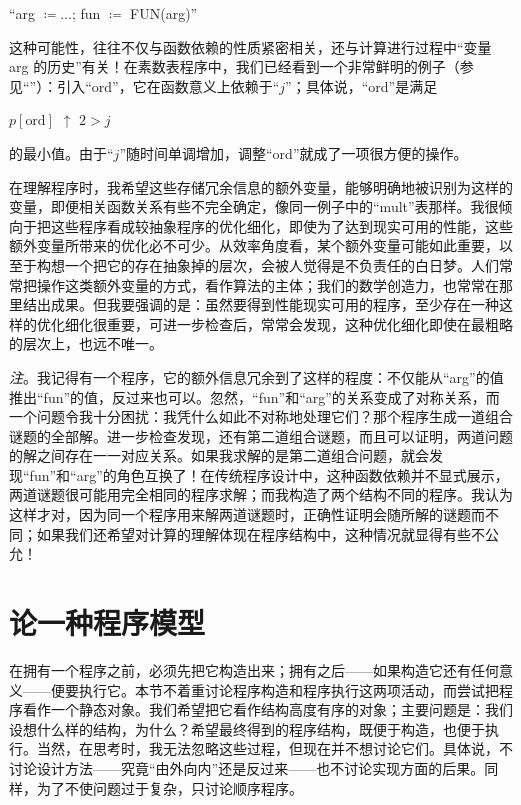 {
	\setlength{\parindent}{8em}
	\hspace{-.4em}``arg $\coloneq\dots$; fun $\coloneq$ FUN(arg)''
}
\medskip

这种可能性，往往不仅与函数依赖的性质紧密相关，还与计算进行过程中“变量 arg 的历史”有关！在素数表程序中，我们已经看到一个非常鲜明的例子（参见“”）：引入“ord”，它在函数意义上依赖于“$j$”；具体说，“ord”是满足
\medskip

{
	\setlength{\parindent}{8em}
	$p[\text{ord}]$ $\uparrow$ $2 > j$
}
\medskip

\noindent
的最小值。由于“$j$”随时间单调增加，调整“ord”就成了一项很方便的操作。

在理解程序时，我希望这些存储冗余信息的额外变量，能够明确地被识别为这样的变量，即便相关函数关系有些不完全确定，像同一例子中的“mult”表那样。我很倾向于把这些程序看成较抽象程序的优化细化，即使为了达到现实可用的性能，这些额外变量所带来的优化必不可少。从效率角度看，某个额外变量可能如此重要，以至于构想一个把它的存在抽象掉的层次，会被人觉得是不负责任的白日梦。人们常常把操作这类额外变量的方式，看作算法的主体；我们的数学创造力，也常常在那里结出成果。但我要强调的是：虽然要得到性能现实可用的程序，至少存在一种这样的优化细化很重要，可进一步检查后，常常会发现，这种优化细化即使在最粗略的层次上，也远不唯一。

\noindent
\textit{注}。我记得有一个程序，它的额外信息冗余到了这样的程度：不仅能从“arg”的值推出“fun”的值，反过来也可以。忽然，“fun”和“arg”的关系变成了对称关系，而一个问题令我十分困扰：我凭什么如此不对称地处理它们？那个程序生成一道组合谜题的全部解。进一步检查发现，还有第二道组合谜题，而且可以证明，两道问题的解之间存在一一对应关系。如果我求解的是第二道组合问题，就会发现“fun”和“arg”的角色互换了！在传统程序设计中，这种函数依赖并不显式展示，两道谜题很可能用完全相同的程序求解；而我构造了两个结构不同的程序。我认为这样才对，因为同一个程序用来解两道谜题时，正确性证明会随所解的谜题而不同；如果我们还希望对计算的理解体现在程序结构中，这种情况就显得有些不公允！

\section[论一种程序模型]{论一种程序模型}
\label{eq:program-model}

在拥有一个程序之前，必须先把它构造出来；拥有之后——如果构造它还有任何意义——便要执行它。本节不着重讨论程序构造和程序执行这两项活动，而尝试把程序看作一个静态对象。我们希望把它看作结构高度有序的对象；主要问题是：我们设想什么样的结构，为什么？希望最终得到的程序结构，既便于构造，也便于执行。当然，在思考时，我无法忽略这些过程，但现在并不想讨论它们。具体说，不讨论设计方法——究竟“由外向内”还是反过来——也不讨论实现方面的后果。同样，为了不使问题过于复杂，只讨论顺序程序。

